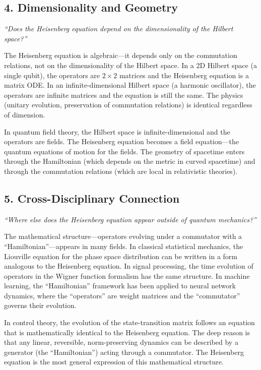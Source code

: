 \subsection*{4. Dimensionality and Geometry}
\textit{``Does the Heisenberg equation depend on the dimensionality of the Hilbert space?''}

The Heisenberg equation is algebraic---it depends only on the commutation relations, not on the dimensionality of the Hilbert space. In a 2D Hilbert space (a single qubit), the operators are $2\times 2$ matrices and the Heisenberg equation is a matrix ODE. In an infinite-dimensional Hilbert space (a harmonic oscillator), the operators are infinite matrices and the equation is still the same. The physics (unitary evolution, preservation of commutation relations) is identical regardless of dimension.

In quantum field theory, the Hilbert space is infinite-dimensional and the operators are fields. The Heisenberg equation becomes a field equation---the quantum equations of motion for the fields. The geometry of spacetime enters through the Hamiltonian (which depends on the metric in curved spacetime) and through the commutation relations (which are local in relativistic theories).

\subsection*{5. Cross-Disciplinary Connection}
\textit{``Where else does the Heisenberg equation appear outside of quantum mechanics?''}

The mathematical structure---operators evolving under a commutator with a ``Hamiltonian''---appears in many fields. In classical statistical mechanics, the Liouville equation for the phase space distribution can be written in a form analogous to the Heisenberg equation. In signal processing, the time evolution of operators in the Wigner function formalism has the same structure. In machine learning, the ``Hamiltonian'' framework has been applied to neural network dynamics, where the ``operators'' are weight matrices and the ``commutator'' governs their evolution.

In control theory, the evolution of the state-transition matrix follows an equation that is mathematically identical to the Heisenberg equation. The deep reason is that any linear, reversible, norm-preserving dynamics can be described by a generator (the ``Hamiltonian'') acting through a commutator. The Heisenberg equation is the most general expression of this mathematical structure.

